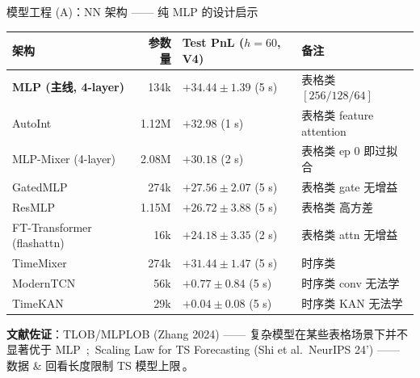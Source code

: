 \documentclass[aspectratio=169,11pt]{beamer}
\newcommand{\rhl}[1]{\textcolor{accred}{\textbf{#1}}}
\begin{document}
\begin{frame}{模型工程 (A)：NN 架构 —— 纯 MLP 的设计启示}
  \vspace{2pt}
  \begin{center}
    \setlength{\tabcolsep}{4pt}\renewcommand{\arraystretch}{1.05}
    \scriptsize
    \begin{tabular}{@{}lrlp{4.4cm}@{}}
      \toprule
      \textbf{架构} & \textbf{参数量} & \textbf{Test PnL ($h{=}60$, V4)} & \textbf{备注} \\
      \midrule
      \rowcolor{tabularbg}\rhl{MLP (主线, 4-layer)} & 134k  & \rhl{$+34.44 \pm 1.39$}\,\,(5 s) & 表格类 $[256/128/64]$ \\
      \rowcolor{tabularbg}AutoInt                  & 1.12M & $+32.98$\,\,(1 s)                 & 表格类 feature attention \\
      \rowcolor{tabularbg}MLP-Mixer (4-layer)       & 2.08M & $+30.18$\,\,(2 s)                 & 表格类 ep 0 即过拟合 \\
      \rowcolor{tabularbg}GatedMLP                 & 274k  & $+27.56 \pm 2.07$\,\,(5 s)        & 表格类 gate 无增益 \\
      \rowcolor{tabularbg}ResMLP                   & 1.15M & $+26.72 \pm 3.88$\,\,(5 s)        & 表格类 高方差 \\
      \rowcolor{tabularbg}FT-Transformer (flashattn) & 16k & $+24.18 \pm 3.35$\,\,(2 s)         & 表格类 attn 无增益 \\
      \midrule
      \rowcolor{seqbg}TimeMixer                  & 274k  & $+31.44 \pm 1.47$\,\,(5 s)        & 时序类 \\
      \rowcolor{seqbg}ModernTCN                  & 56k   & $+0.77 \pm 0.84$\,\,(5 s)         & 时序类 conv 无法学 \\
      \rowcolor{seqbg}TimeKAN                    & 29k   & $+0.04 \pm 0.08$\,\,(5 s)         & 时序类 KAN 无法学 \\
      \bottomrule
    \end{tabular}
  \end{center}

  \vspace{2pt}
  \begin{center}\tiny
    \textbf{文献佐证}：TLOB/MLPLOB (Zhang 2024) —— 复杂模型在某些表格场景下并不显著优于 MLP \,;\,
    Scaling Law for TS Forecasting (Shi et al.\ NeurIPS 24') —— 数据 \& 回看长度限制 TS 模型上限\,。
  \end{center}
\end{frame}
\end{document}
